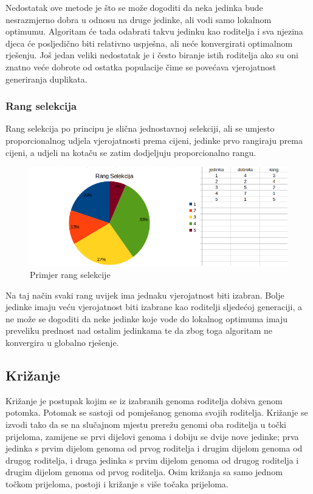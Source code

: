 \documentclass[times, utf8, zavrsni, numeric]{fer}
\begin{document}
Nedostatak ove metode je što se može dogoditi da neka jedinka bude nesrazmjerno dobra u odnosu na druge jedinke, ali vodi samo lokalnom optimumu. Algoritam će tada odabrati takvu jedinku kao roditelja i sva njezina djeca će posljedično biti relativno uspješna, ali neće konvergirati optimalnom rješenju. Još jedan veliki nedostatak je i često biranje istih roditelja ako su oni znatno veće dobrote od ostatka populacije čime se povećava vjerojatnost generiranja duplikata.

\subsubsection{Rang selekcija}
Rang selekcija po principu je slična jednostavnoj selekciji, ali se umjesto proporcionalnog udjela vjerojatnosti prema cijeni, jedinke prvo rangiraju prema cijeni, a udjeli na kotaču se zatim dodjeljuju proporcionalno rangu.

\begin{figure}[htb]
\centering
\includegraphics[width=14cm]{images/rang_selekcija.png}
\caption{Primjer rang selekcije}
\label{fig:rang selekcija}
\end{figure}

Na taj način svaki rang uvijek ima jednaku vjerojatnost biti izabran. Bolje jedinke imaju veću vjerojatnost biti izabrane kao roditelji sljedećoj generaciji, a ne može se dogoditi da neke jedinke koje vode do lokalnog optimuma imaju preveliku prednost nad ostalim jedinkama te da zbog toga algoritam ne konvergira u globalno rješenje.

\subsection{Križanje}
Križanje je postupak kojim se iz izabranih genoma roditelja dobiva genom potomka. Potomak se sastoji od pomješanog genoma svojih roditelja. Križanje se izvodi tako da se na slučajnom mjestu prerežu genomi oba roditelja u točki prijeloma, zamijene se prvi dijelovi genoma i dobiju se dvije nove jedinke; prva jedinka s prvim dijelom genoma od prvog roditelja i drugim dijelom genoma od drugog roditelja, i druga jedinka s prvim dijelom genoma od drugog roditelja i drugim dijelom genoma od prvog roditelja. Osim križanja sa samo jednom točkom prijeloma, postoji i križanje s više točaka prijeloma.
\end{document}
